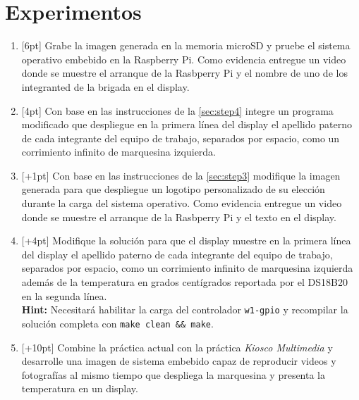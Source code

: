 %
%



\section{Experimentos}%
\label{sec:experiments}

\begin{enumerate}
	\item{} [6pt] Grabe la imagen generada en la memoria microSD y pruebe el sistema operativo embebido en la Raspberry Pi.
	Como evidencia entregue un video donde se muestre el arranque de la Rasbperry Pi y el nombre de uno de los integranted de la brigada en el display.

	\item{} [4pt] Con base en las instrucciones de la \cref{sec:step4} integre un programa modificado que despliegue en la primera línea del display el apellido paterno de cada integrante del equipo de trabajo, separados por espacio, como un corrimiento infinito de marquesina izquierda.

	\item{} [+1pt] Con base en las instrucciones de la \cref{sec:step3} modifique la imagen generada para que despliegue un logotipo personalizado de su elección durante la carga del sistema operativo.
	Como evidencia entregue un video donde se muestre el arranque de la Rasbperry Pi y el texto en el display.

	\item{} [+4pt] Modifique la solución para que el display muestre en la primera línea del display el apellido paterno de cada integrante del equipo de trabajo, separados por espacio, como un corrimiento infinito de marquesina izquierda además de la temperatura en grados centígrados reportada por el DS18B20 en la segunda línea.\\[1em]
	\textbf{Hint: }Necesitará habilitar la carga del controlador \texttt{w1-gpio} y recompilar la solución completa con \texttt{make clean \&\& make}.

	\item{} [+10pt] Combine la práctica actual con la práctica \emph{Kiosco Multimedia} y desarrolle una imagen de sistema embebido capaz de reproducir videos y fotografías al mismo tiempo que despliega la marquesina y presenta la temperatura en un display.
\end{enumerate}

